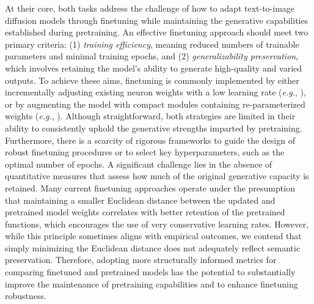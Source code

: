At their core, both tasks address the challenge of how to adapt text-to-image diffusion models through finetuning while maintaining the generative capabilities established during pretraining. An effective finetuning approach should meet two primary criteria: (1) \emph{training efficiency}, meaning reduced numbers of trainable parameters and minimal training epochs, and (2) \emph{generalizability preservation}, which involves retaining the model's ability to generate high-quality and varied outputs. To achieve these aims, finetuning is commonly implemented by either incrementally adjusting existing neuron weights with a low learning rate (\emph{e.g.}, \cite{ruiz2023dreambooth}), or by augmenting the model with compact modules containing re-parameterized weights (\emph{e.g.}, \cite{hulora2022,zhang2023adding}). Although straightforward, both strategies are limited in their ability to consistently uphold the generative strengths imparted by pretraining. Furthermore, there is a scarcity of rigorous frameworks to guide the design of robust finetuning procedures or to select key hyperparameters, such as the optimal number of epochs. A significant challenge lies in the absence of quantitative measures that assess how much of the original generative capacity is retained. Many current finetuning approaches operate under the presumption that maintaining a smaller Euclidean distance between the updated and pretrained model weights correlates with better retention of the pretrained functions, which encourages the use of very conservative learning rates. However, while this principle sometimes aligns with empirical outcomes, we contend that simply minimizing the Euclidean distance does not adequately reflect semantic preservation. Therefore, adopting more structurally informed metrics for comparing finetuned and pretrained models has the potential to substantially improve the maintenance of pretraining capabilities and to enhance finetuning robustness.

